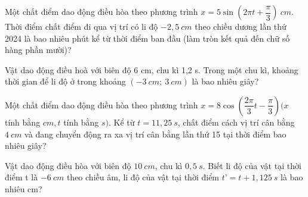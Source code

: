 \setcounter{ex}{0}
\PhanIII
\begin{ex}
Một chất điểm dao động điều hòa theo phương trình $x=5 \sin \left(2 \pi t+\dfrac{\pi}{3}\right)\ cm$. Thời điểm chất điểm đi qua vị trí có li độ $-2,5 \ cm$ theo chiều dương lần thứ 2024 là bao nhiêu phút kể từ thời điểm ban đầu (làm tròn kết quả đến chữ số hàng phần mười)?
 
\end{ex} 
\begin{ex}%
Vật dao động điều hoà với biên độ 6 cm, chu kì 1,2 s. Trong một chu kì, khoảng thời gian để li độ ở trong khoảng $(- 3\ cm;\ 3\ cm)$ là bao nhiêu giây? 
\end{ex} 
\begin{ex}
Một chất điểm dao động điều hòa theo phương trình $x=8 \cos \left(\dfrac{2 \pi}{3} t-\dfrac{\pi}{3}\right)(x$ tính bằng $cm, t$ tính bằng $s)$. Kể từ $t=11,25 \ s$, chất điểm cách vị trí cân bằng $4 \ cm$ và đang chuyển động ra xa vị trí cân bằng lần thứ 15 tại thời điểm bao nhiêu giây?
\end{ex} 
\begin{ex}%
Vật dao động điều hòa với biên độ $10\ cm$, chu kì $0,5\ s$. Biết li độ của vật tại thời điểm t là $- 6\ cm$ theo chiều âm, li độ của vật tại thời điểm $t’ = t + 1,125\ s$ là bao nhiêu cm?
\end{ex} 


